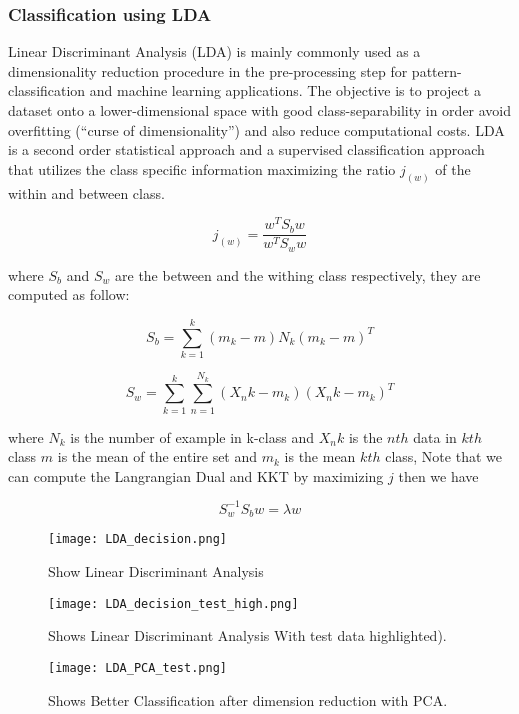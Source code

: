 \documentclass[a4paper, parskip=full]{scrartcl}
\begin{document}
\subsubsection*{Classification using LDA}

Linear Discriminant Analysis (LDA) is mainly commonly used as a dimensionality reduction procedure in the pre-processing step for pattern-classification and machine learning applications. The objective is to project a dataset onto a lower-dimensional space with good class-separability in order avoid overfitting (“curse of dimensionality”) and also reduce computational costs. LDA is a second order statistical approach and a supervised classification approach that utilizes the class specific information maximizing the ratio $j_{(w)}$ of the within and between class.

\[j_{(w)} =\dfrac{w^TS_b w}{w^T S_w w}\]

where $S_b$ and  $S_w$ are the between and the withing class respectively, they are computed as follow:

\[S_b = \sum_{k =1}^{k} (m_k - m)N_k(m_k - m)^T\]

\[S_w = \sum_{k =1}^{k} \sum_{n =1}^{N_k}(X_nk - m_k)(X_nk - m_k)^T\]

where $N_k$ is the number of example in k-class and $X_nk$ is the $nth$ data in $kth$ class $m$ is the mean of the entire set and $m_k$ is the mean $kth$ class, Note that we can compute the Langrangian Dual and KKT by maximizing $j$ then we have

\[S_w^{-1}S_b w = \lambda w\]

\newpage

\begin{figure}
	
	\centering
	\texttt{[image: LDA\_decision.png]}
	\caption{Show Linear Discriminant Analysis }
	
\end{figure}

\begin{figure}
	\centering
	\texttt{[image: LDA\_decision\_test\_high.png]}
	\caption{ Shows Linear Discriminant Analysis With test data highlighted).}
	
\end{figure}

\begin{figure}
	\centering
	\texttt{[image: LDA\_PCA\_test.png]}
	\caption{ Shows Better Classification after dimension reduction with PCA.}
	
\end{figure}
\end{document}
